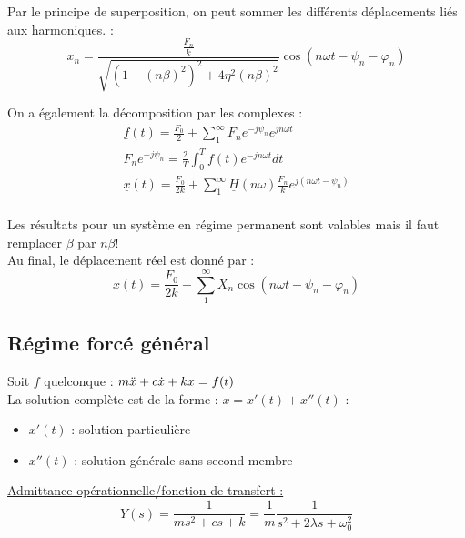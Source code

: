 \documentclass[../main.tex]{subfiles}
\begin{document}
Par le principe de superposition, on peut sommer les différents déplacements liés aux harmoniques. : \begin{equation}
    x_n = \frac{\frac{F_n}{k}}{\sqrt{(1-(n\beta)^2)^2+4\eta^2(n\beta)^2}} \cos(n \omega t - \psi_n - \varphi_n)
\end{equation}

On a également la décomposition par les complexes : \begin{equation}
    \begin{gathered}
        \underline{f}(t) = \frac{F_0}{2} + \sum_1^\infty F_n e^{-j\psi_n} e^{jn\omega t}\\
        F_n e^{-j\psi_n} = \frac{2}{T} \int_0^T f(t) e^{-jn\omega t}dt\\
        \underline{x}(t) = \frac{F_0}{2k} + \sum_1^\infty \underline{H}(n\omega) \frac{F_n}{k} e^{j(n\omega t-\psi_n)}\\
    \end{gathered}
\end{equation}

\warning Les résultats pour un système en régime permanent sont valables mais il faut remplacer $\beta$ par $n \beta$!\\

Au final, le déplacement réel est donné par : \begin{equation}
    x(t) = \frac{F_0}{2k} + \sum_1^\infty X_n \cos(n\omega t - \psi_n - \varphi_n)
\end{equation}

\subsection{Régime forcé général}
Soit $f$ quelconque : $m\Ddot{x}+c\dot{x}+kx=f(t)$\\
La solution complète est de la forme : $x = x'(t)+x''(t)$ : \begin{itemize}
    \item $x'(t)$ : solution particulière\\
    \item $x''(t)$ : solution générale sans second membre\\
\end{itemize}

\quad \underline{Admittance opérationnelle/fonction de transfert :}\\
\begin{equation}
    Y(s) = \frac{1}{ms^2+cs+k} = \frac{1}{m} \frac{1}{s^2+2\lambda s+\omega_0^2}
\end{equation}
\end{document}
